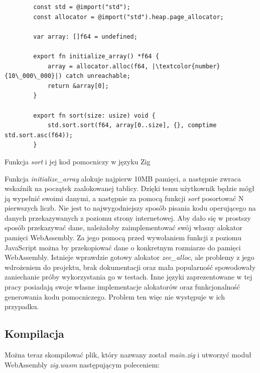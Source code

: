 \documentclass[language=polish,type=master]{aghmodern}
\begin{document}
\begin{listing}[H]
    \begin{verbatim}
        const std = @import("std");
        const allocator = @import("std").heap.page_allocator;

        var array: []f64 = undefined;

        export fn initialize_array() *f64 {
            array = allocator.alloc(f64, |\textcolor{number}{10\_000\_000}|) catch unreachable;
            return &array[0];
        }

        export fn sort(size: usize) void {
            std.sort.sort(f64, array[0..size], {}, comptime std.sort.asc(f64));
        }
    \end{verbatim}
    \caption{Funkcja \emph{sort} i jej kod pomocniczy w języku Zig}
\end{listing}

Funkcja \emph{initialize\_array} alokuje najpierw 10MB pamięci, a następnie zwraca wskaźnik na początek zaalokowanej tablicy.
Dzięki temu użytkownik będzie mógł ją wypełnić swoimi danymi, a następnie za pomocą funkcji \emph{sort} posortować N pierwszych liczb.
Nie jest to najwygodniejszy sposób pisania kodu operującego na danych przekazywanych z poziomu strony internetowej.
Aby dało się w prostszy sposób przekazywać dane, należałoby zaimplementować swój własny alokator\footnotemark{} pamięci WebAssembly.
Za jego pomocą przed wywołaniem funkcji z poziomu JavaScript można by przekopiować dane o konkretnym rozmiarze do pamięci WebAssembly.
Istnieje wprawdzie gotowy alokator \emph{zee\_alloc}\footnotemark{}, ale problemy z jego wdrożeniem do projektu, brak dokumentacji oraz mała popularność spowodowały zaniechanie próby wykorzystania go w testach.
Inne języki zaprezentowane w tej pracy posiadają swoje własne implementacje alokatorów oraz funkcjonalność generowania kodu pomocniczego.
Problem ten więc nie występuje w ich przypadku.

\subsection{Kompilacja}
Można teraz skompilować plik, który nazwany został \emph{main.zig} i utworzyć moduł WebAssembly \emph{zig.wasm} następującym poleceniem:
\end{document}
